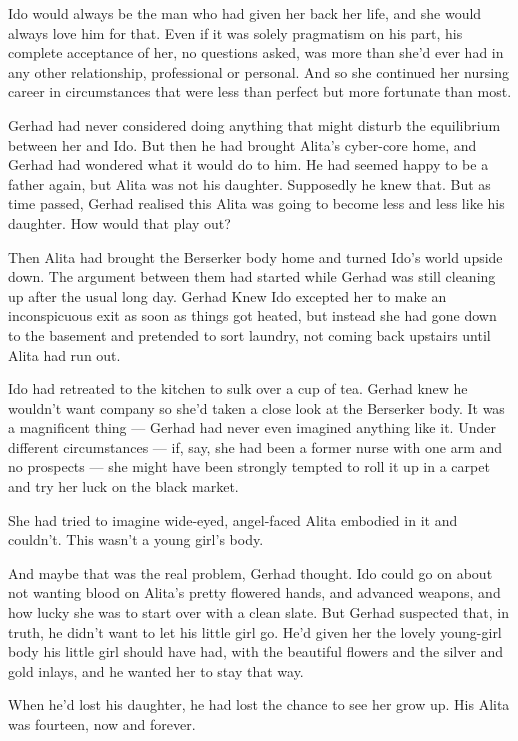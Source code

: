 \documentclass[11pt]{article}
\begin{document}
Ido would always be the man who had given her back her life, and she would always love him for that. Even if it was solely pragmatism on his part, his complete acceptance of her, no questions asked, was more than she'd ever had in any other relationship, professional or personal. And so she continued her nursing career in circumstances that were less than perfect but more fortunate than most.

Gerhad had never considered doing anything that might disturb the equilibrium between her and Ido. But then he had brought Alita's cyber-core home, and Gerhad had wondered what it would do to him. He had seemed happy to be a father again, but Alita was not his daughter. Supposedly he knew that. But as time passed, Gerhad realised this Alita was going to become less and less like his daughter. How would that play out?

Then Alita had brought the Berserker body home and turned Ido's world upside down. The argument between them had started while Gerhad was still cleaning up after the usual long day. Gerhad Knew Ido excepted her to make an inconspicuous exit as soon as things got heated, but instead she had gone down to the basement and pretended to sort laundry, not coming back upstairs until Alita had run out.

Ido had retreated to the kitchen to sulk over a cup of tea. Gerhad knew he wouldn't want company so she'd taken a close look at the Berserker body. It was a magnificent thing --- Gerhad had never even imagined anything like it. Under different circumstances --- if, say, she had been a former nurse with one arm and no prospects --- she might have been strongly tempted to roll it up in a carpet and try her luck on the black market.

She had tried to imagine wide-eyed, angel-faced Alita embodied in it and couldn't. This wasn't a young girl's body.

And maybe that was the real problem, Gerhad thought. Ido could go on about not wanting blood on Alita's pretty flowered hands, and advanced weapons, and how lucky she was to start over with a clean slate. But Gerhad suspected that, in truth, he didn't want to let his little girl go. He'd given her the lovely young-girl body his little girl should have had, with the beautiful flowers and the silver and gold inlays, and he wanted her to stay that way.

When he'd lost his daughter, he had lost the chance to see her grow up. His Alita was fourteen, now and forever.
\end{document}
